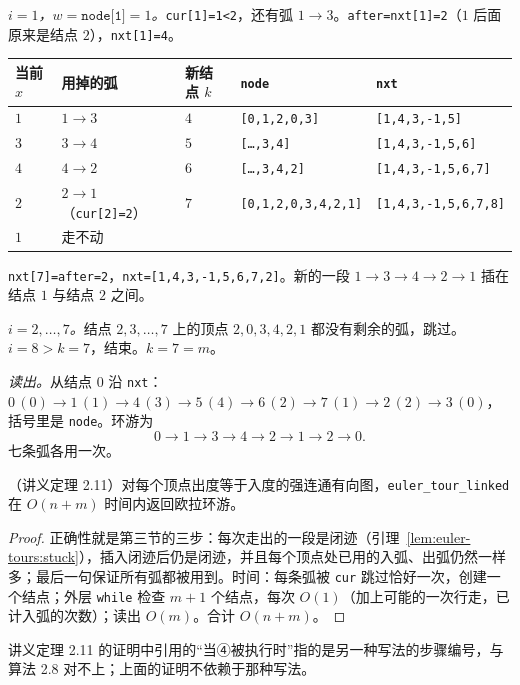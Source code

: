 \begin{example}
\emph{$i=1$，$w=\texttt{node[1]}=1$。}\texttt{cur[1]=1<2}，还有弧 $1\to3$。\texttt{after=nxt[1]=2}（$1$ 后面原来是结点 $2$），\texttt{nxt[1]=4}。
\begin{center}
\small
\begin{tabular}{lllll}
\toprule
当前 $x$ & 用掉的弧 & 新结点 $k$ & \texttt{node} & \texttt{nxt} \\
\midrule
$1$ & $1\to3$ & $4$ & \texttt{[0,1,2,0,3]} & \texttt{[1,4,3,-1,5]} \\
$3$ & $3\to4$ & $5$ & \texttt{[\dots,3,4]} & \texttt{[1,4,3,-1,5,6]} \\
$4$ & $4\to2$ & $6$ & \texttt{[\dots,3,4,2]} & \texttt{[1,4,3,-1,5,6,7]} \\
$2$ & $2\to1$（\texttt{cur[2]=2}） & $7$ & \texttt{[0,1,2,0,3,4,2,1]} & \texttt{[1,4,3,-1,5,6,7,8]} \\
$1$ & 走不动 & & & \\
\bottomrule
\end{tabular}
\end{center}
\texttt{nxt[7]=after=2}，\texttt{nxt=[1,4,3,-1,5,6,7,2]}。新的一段 $1\to3\to4\to2\to1$ 插在结点 $1$ 与结点 $2$ 之间。

\emph{$i=2,\dots,7$。}结点 $2,3,\dots,7$ 上的顶点 $2,0,3,4,2,1$ 都没有剩余的弧，跳过。$i=8>k=7$，结束。$k=7=m$。

\emph{读出。}从结点 $0$ 沿 \texttt{nxt}：$0\,(0)\to1\,(1)\to4\,(3)\to5\,(4)\to6\,(2)\to7\,(1)\to2\,(2)\to3\,(0)$，括号里是 \texttt{node}。环游为
\[
0\to1\to3\to4\to2\to1\to2\to0 .
\]
七条弧各用一次。
\end{example}

\begin{theorem}\label{thm:euler-tours:time}
（讲义定理 2.11）对每个顶点出度等于入度的强连通有向图，\texttt{euler\_tour\_linked} 在 $O(n+m)$ 时间内返回欧拉环游。
\end{theorem}
\begin{proof}
正确性就是第三节的三步：每次走出的一段是闭迹（引理~\ref{lem:euler-tours:stuck}），插入闭迹后仍是闭迹，并且每个顶点处已用的入弧、出弧仍然一样多；最后一句保证所有弧都被用到。时间：每条弧被 \texttt{cur} 跳过恰好一次，创建一个结点；外层 \texttt{while} 检查 $m+1$ 个结点，每次 $O(1)$（加上可能的一次行走，已计入弧的次数）；读出 $O(m)$。合计 $O(n+m)$。
\end{proof}

讲义定理 2.11 的证明中引用的“当④被执行时”指的是另一种写法的步骤编号，与算法 2.8 对不上；上面的证明不依赖于那种写法。


